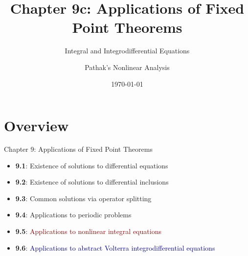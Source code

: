 \documentclass[aspectratio=169,10pt]{beamer}
\title{Chapter 9c: Applications of Fixed Point Theorems}
\subtitle{Integral and Integrodifferential Equations}
\author{Pathak's Nonlinear Analysis}
\date{\today}
\begin{document}
\frame{\titlepage}

\section{Overview}

\begin{frame}{Chapter 9: Applications of Fixed Point Theorems}
\begin{itemize}
    \item<1-> \textbf{9.1}: Existence of solutions to differential equations
    \item<2-> \textbf{9.2}: Existence of solutions to differential inclusions
    \item<3-> \textbf{9.3}: Common solutions via operator splitting
    \item<4-> \textbf{9.4}: Applications to periodic problems
    \item<5-> \textbf{9.5}: \textcolor{darkred}{Applications to nonlinear integral equations}
    \item<6-> \textbf{9.6}: \textcolor{darkblue}{Applications to abstract Volterra integrodifferential equations}
\end{itemize}

\vspace{2em}
\end{frame}
\end{document}
